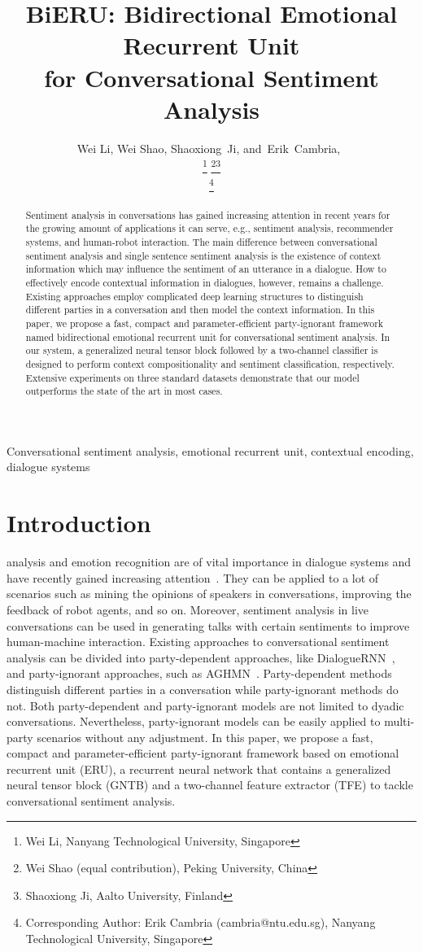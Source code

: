 \documentclass[journal]{IEEEtran}
\title{BiERU: Bidirectional Emotional Recurrent Unit \\for Conversational Sentiment Analysis}
\author{Wei Li,
        Wei Shao,
        Shaoxiong~Ji,
        and~Erik~Cambria,~\IEEEmembership{Senior Member,~IEEE}

\thanks{Wei Li, Nanyang Technological University, Singapore}
\thanks{Wei Shao (equal contribution), Peking University, China}\thanks{Shaoxiong Ji, Aalto University, Finland}

\thanks{Corresponding Author: Erik Cambria (cambria@ntu.edu.sg), Nanyang Technological University, Singapore}
}
\date{}
\begin{document}
\maketitle
\begin{abstract}
Sentiment analysis in conversations has gained increasing attention in recent years for the growing amount of applications it can serve, e.g., sentiment analysis, recommender systems, and human-robot interaction. The main difference between conversational sentiment analysis and single sentence sentiment analysis is the existence of context information which may influence the sentiment of an utterance in a dialogue. How to effectively encode contextual information in dialogues, however, remains a challenge. Existing approaches employ complicated deep learning structures to distinguish different parties in a conversation and then model the context information. In this paper, we propose a fast, compact and parameter-efficient party-ignorant framework named bidirectional emotional recurrent unit for conversational sentiment analysis. In our system, a generalized neural tensor block followed by a two-channel classifier is designed to perform context compositionality and sentiment classification, respectively. Extensive experiments on three standard datasets demonstrate that our model outperforms the state of the art in most cases.
\end{abstract}

\begin{IEEEkeywords}
Conversational sentiment analysis, emotional recurrent unit, contextual encoding, dialogue systems
\end{IEEEkeywords}

\section{Introduction}
\label{sec:intro}
 analysis and emotion recognition are of vital importance in dialogue systems and have recently gained increasing attention~\cite{maasur}. They can be applied to a lot of scenarios such as mining the opinions of  speakers in conversations, improving the feedback of robot agents, and so on. Moreover, sentiment analysis in live conversations can be used in generating talks with certain sentiments to improve human-machine interaction. Existing approaches to conversational sentiment analysis can be divided into party-dependent approaches, like DialogueRNN~\cite{majumder2019dialoguernn}, and party-ignorant approaches, such as AGHMN~\cite{jiao2019real}. Party-dependent methods distinguish different parties in a conversation while party-ignorant methods do not.  Both party-dependent and party-ignorant models are not limited to dyadic conversations. 
Nevertheless, party-ignorant models can be easily applied to multi-party scenarios without any adjustment. In this paper, we propose a fast, compact and parameter-efficient party-ignorant framework based on emotional recurrent unit (ERU), a recurrent neural network that contains a generalized neural tensor block (GNTB) and a two-channel feature extractor (TFE) to tackle conversational sentiment analysis.
\end{document}
